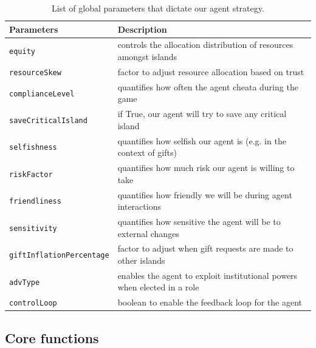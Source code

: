 \documentclass{article}
\begin{document}
\begin{center}
    
\begin{table}[H]
\centering
\begin{tabular}{l|l}
\textbf{Parameters} & \textbf{Description}  \\ 
\hline
\texttt{equity}                       & controls the allocation distribution of resources amongst islands              \\ \hdashline
\texttt{resourceSkew}                 & factor to adjust resource allocation based on trust             \\ \hdashline
\texttt{complianceLevel}              & quantifies how often the agent cheata during the game             \\ \hdashline
\texttt{saveCriticalIsland}           & if True, our agent will try to save any critical island             \\ \hdashline
\texttt{selfishness}                  & quantifies how selfish our agent is (e.g. in the context of gifts)             \\ \hdashline
\texttt{riskFactor}                   & quantifies how much risk our agent is willing to take        \\ \hdashline
\texttt{friendliness}                 & quantifies how friendly we will be during agent interactions            \\ \hdashline
\texttt{sensitivity}                  & quantifies how sensitive the agent will be to external changes            \\ \hdashline
\texttt{giftInflationPercentage}      & factor to adjust when gift requests are made to other islands             \\ \hdashline
\texttt{advType}                      & enables the agent to exploit institutional powers when elected in a role    \\ \hdashline
\texttt{controlLoop}                  & boolean to enable the feedback loop for the agent       
\end{tabular}
\caption{List of global parameters that dictate our agent strategy.}
\label{tab:team3:parameter_effects}
\end{table}
\end{center}

\subsection{Core functions}
\end{document}
